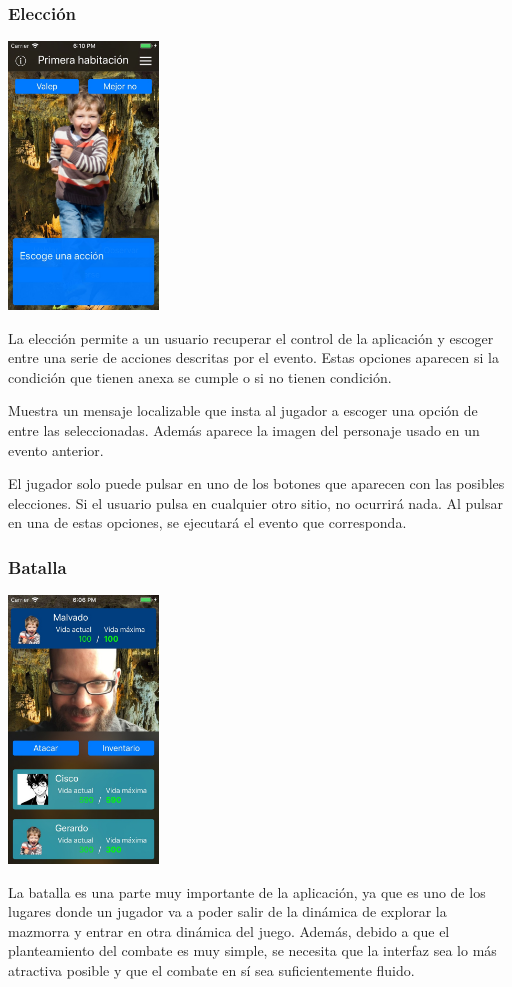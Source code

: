 \subsubsection{Elección}
\begin{center}
	\includegraphics[width=0.3\textwidth]{include/snapshots/chose.jpg}
\end{center}
La elección permite a un usuario recuperar el control de la aplicación y escoger entre una serie de acciones descritas por el evento. Estas opciones aparecen si la condición que tienen anexa se cumple o si no tienen condición.

Muestra un mensaje localizable que insta al jugador a escoger una opción de entre las seleccionadas. Además aparece la imagen del personaje usado en un evento anterior.

El jugador solo puede pulsar en uno de los botones que aparecen con las posibles elecciones. Si el usuario pulsa en cualquier otro sitio, no ocurrirá nada.
Al pulsar en una de estas opciones, se ejecutará el evento que corresponda.

\subsubsection{Batalla} \label{battleDesignSubsection}
\begin{center}
	\includegraphics[width=0.3\textwidth]{include/snapshots/battle.jpg}
\end{center}
La batalla es una parte muy importante de la aplicación, ya que es uno de los lugares donde un jugador va a poder salir de la dinámica de explorar la mazmorra y entrar en otra dinámica del juego.
Además, debido a que el planteamiento del combate es muy simple, se necesita que la interfaz sea lo más atractiva posible y que el combate en sí sea suficientemente fluido.

